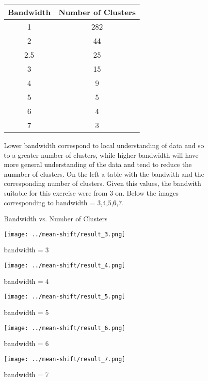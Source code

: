 \documentclass{ETHExercise}
\begin{document}
\begin{figure}[htbp]
  \begin{minipage}[t]{0.6\textwidth}
    \centering
    \begin{tabular}{|c|c|}
      \hline
      \textbf{Bandwidth} & \textbf{Number of Clusters} \\
      \hline
      1 & 282 \\
      2 & 44 \\
      2.5 & 25 \\
      3 & 15 \\
      4 & 9 \\
      5 & 5 \\
      6 & 4 \\
      7 & 3 \\
      \hline
    \end{tabular}
    \caption{Bandwidth vs. Number of Clusters}
    \label{tab:bandwidth_clusters}
  \end{minipage}%
  \hfill
  \begin{minipage}{0.4\textwidth}
    Lower bandwidth correspond to local understanding of data and so to a greater number of clusters, 
    while higher bandwidth will have more general understanding of the data and tend to reduce the numnber of 
    clusters. On the left a table with the bandwith and the corresponding number of clusters. 
    Given this values, the bandwith suitable for this exercise were from 3 on.
    Below the images corresponding to bandwidth = 3,4,5,6,7. \end{minipage}
\end{figure}


\begin{figure}[!h]
    \texttt{[image: ../mean-shift/result\_3.png]}
    \caption{bandwidth = 3}
  \endminipage\hfill
    \texttt{[image: ../mean-shift/result\_4.png]}
    \caption{bandwidth = 4}
  \endminipage\hfill
    \texttt{[image: ../mean-shift/result\_5.png]}
    \caption{bandwidth = 5}
  \endminipage\hfill
    \texttt{[image: ../mean-shift/result\_6.png]}
    \caption{bandwidth = 6}
  \endminipage\space\space\space 
    \texttt{[image: ../mean-shift/result\_7.png]}
    \caption{bandwidth = 7}
  \endminipage
  \end{figure}
\end{document}
